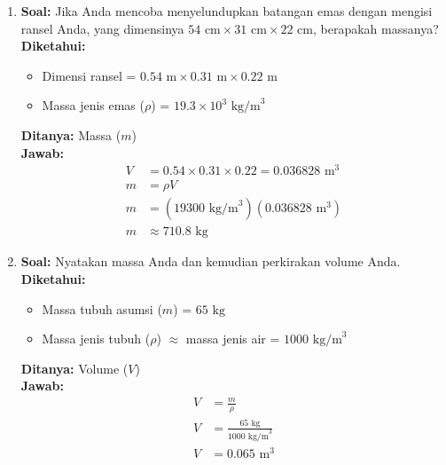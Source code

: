 \documentclass[twocolumn]{article}
\begin{document}
\begin{enumerate}
    \item \textbf{Soal:} Jika Anda mencoba menyelundupkan batangan emas dengan mengisi ransel Anda, yang dimensinya $54 \text{ cm} \times 31 \text{ cm} \times 22 \text{ cm}$, berapakah massanya? \\
    \textbf{Diketahui:}
    \begin{itemize}
        \item Dimensi ransel = $0.54 \text{ m} \times 0.31 \text{ m} \times 0.22 \text{ m}$
        \item Massa jenis emas ($\rho$) = $19.3 \times 10^3 \text{ kg/m}^3$
    \end{itemize}
    \textbf{Ditanya:} Massa ($m$) \\
    \textbf{Jawab:}
    \begin{align*}
        V &= 0.54 \times 0.31 \times 0.22 = 0.036828 \text{ m}^3 \\
        m &= \rho V \\
        m &= (19300 \text{ kg/m}^3)(0.036828 \text{ m}^3) \\
        m &\approx 710.8 \text{ kg}
    \end{align*}

    \item \textbf{Soal:} Nyatakan massa Anda dan kemudian perkirakan volume Anda. \\
    \textbf{Diketahui:}
    \begin{itemize}
        \item Massa tubuh asumsi ($m$) = $65 \text{ kg}$
        \item Massa jenis tubuh ($\rho$) $\approx$ massa jenis air = $1000 \text{ kg/m}^3$
    \end{itemize}
    \textbf{Ditanya:} Volume ($V$) \\
    \textbf{Jawab:}
    \begin{align*}
        V &= \frac{m}{\rho} \\
        V &= \frac{65 \text{ kg}}{1000 \text{ kg/m}^3} \\
        V &= 0.065 \text{ m}^3
    \end{align*}


\end{enumerate}
\end{document}
